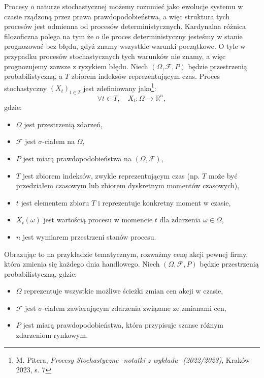 Procesy o naturze stochastycznej możemy rozumieć jako ewolucje systemu w czasie rządzoną przez prawa prawdopodobieństwa, a więc struktura tych procesów jest odmienna od procesów deterministycznych. Kardynalna różnica filozoficzna polega na tym że o ile proces deterministyczny jesteśmy w stanie prognozować bez błędu, gdyż znamy wszystkie warunki początkowe. O tyle w przypadku procesów stochastycznych tych warunków nie znamy, a więc prognozujemy zawsze z ryzykiem błędu.
Niech \((\Omega, \mathcal{F}, P)\) będzie przestrzenią probabilistyczną, a \( T \) zbiorem indeksów reprezentującym czas. Proces stochastyczny \((X_t)_{t \in T}\) jest zdefiniowany jako\footnote{M. Pitera, \textit{Procesy Stochastyczne -notatki z wykładu- (2022/2023)}, Kraków 2023, s. 7}:
\begin{equation}
\forall t \in T, \quad X_t: \Omega \to \mathbb{R}^n,
\end{equation}
gdzie:
\begin{itemize}
  \item \(\Omega\) jest przestrzenią zdarzeń,
  \item \(\mathcal{F}\) jest \(\sigma\)-ciałem na \(\Omega\),
  \item \(P\) jest miarą prawdopodobieństwa na \((\Omega, \mathcal{F})\),
  \item \(T\) jest zbiorem indeksów, zwykle reprezentującym czas (np. \( T \) może być przedziałem czasowym lub zbiorem dyskretnym momentów czasowych),
  \item \(t\) jest elementem zbioru \(T\) i reprezentuje konkretny moment w czasie,
  \item \(X_t(\omega)\) jest wartością procesu w momencie \(t\) dla zdarzenia \(\omega \in \Omega\),
  \item \(n\) jest wymiarem przestrzeni stanów procesu.
\end{itemize}

Obrazując to na przykładzie tematycznym, rozważmy cenę akcji pewnej firmy, która zmienia się każdego dnia handlowego. 
Niech \((\Omega, \mathcal{F}, P)\) będzie przestrzenią probabilistyczną, gdzie:
\begin{itemize}
  \item \(\Omega\) reprezentuje wszystkie możliwe ścieżki zmian cen akcji w czasie,
  \item \(\mathcal{F}\) jest \(\sigma\)-ciałem zawierającym zdarzenia związane ze zmianami cen,
  \item \(P\) jest miarą prawdopodobieństwa, która przypisuje szanse różnym zdarzeniom rynkowym.
\end{itemize}

